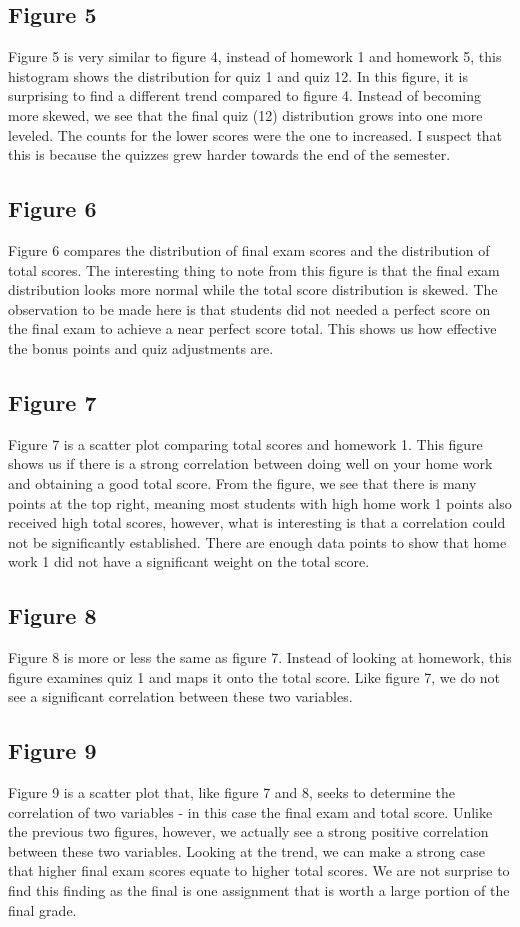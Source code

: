 \documentclass{article}
\begin{document}
\subsection{Figure 5}
Figure 5 is very similar to figure 4, instead of homework 1 and homework 5, this histogram shows the distribution for quiz 1 and quiz 12. In this figure, it is surprising to find a different trend compared to figure 4. Instead of becoming more skewed, we see that the final quiz (12) distribution grows into one more leveled. The counts for the lower scores were the one to increased. I suspect that this is because the quizzes grew harder towards the end of the semester.

\subsection{Figure 6}
Figure 6 compares the distribution of final exam scores and the distribution of total scores. The interesting thing to note from this figure is that the final exam distribution looks more normal while the total score distribution is skewed. The observation to be made here is that students did not needed a perfect score on the final exam to achieve a near perfect score total. This shows us how effective the bonus points and quiz adjustments are.

\subsection{Figure 7}
Figure 7 is a scatter plot comparing total scores and homework 1. This figure shows us if there is a strong correlation between doing well on your home work and obtaining a good total score. From the figure, we see that there is many points at the top right, meaning most students with high home work 1 points also received high total scores, however, what is interesting is that a correlation could not be significantly established. There are enough data points to show that home work 1 did not have a significant weight on the total score.

\subsection{Figure 8}
Figure 8 is more or less the same as figure 7. Instead of looking at homework, this figure examines quiz 1 and maps it onto the total score. Like figure 7, we do not see a significant correlation between these two variables.

\subsection{Figure 9}
Figure 9 is a scatter plot that, like figure 7 and 8, seeks to determine the correlation of two variables - in this case the final exam and total score. Unlike the previous two figures, however, we actually see a strong positive correlation between these two variables. Looking at the trend, we can make a strong case that higher final exam scores equate to higher total scores. We are not surprise to find this finding as the final is one assignment that is worth a large portion of the final grade.
\end{document}
